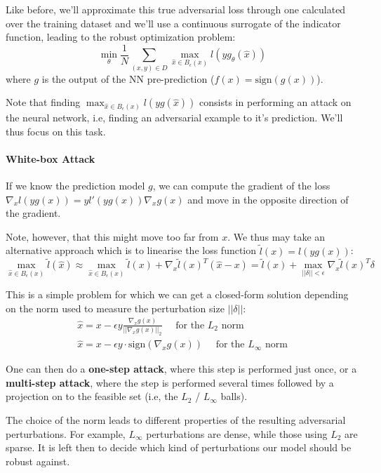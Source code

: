\documentclass{article}
\begin{document}
Like before, we'll approximate this true adversarial loss through one calculated over the training dataset and we'll use a continuous surrogate of the indicator function, leading to the robust optimization problem:
$$
\min_\theta \frac{1}{N} \sum_{(x,y) \in D} \max_{\hat{x} \in B_\epsilon(x)} l(y g_\theta(\hat{x}))
$$
where $g$ is the output of the NN pre-prediction ($f(x) = \text{sign}(g(x))$).

Note that finding $\max_{\hat{x} \in B_\epsilon(x)} l(y g(\hat{x}))$ consists in performing an attack on the neural network, i.e, finding an adversarial example to it's prediction.
We'll thus focus on this task.

\paragraph{White-box Attack}

If we know the prediction model $g$, we can compute the gradient of the loss $\nabla_x l(yg(x)) = yl'(yg(x)) \nabla_x g(x)$ and move in the opposite direction of the gradient.

Note, however, that this might move too far from $x$.
We thus may take an alternative approach which is to linearise the loss function $\tilde{l}(x) = l(yg(x))$:
$$
\max_{\hat{x} \in B_\epsilon(x)} \tilde{l}(\hat{x}) \approx
\max_{\hat{x} \in B_\epsilon(x)} \tilde{l}(x) + \nabla_x \tilde{l}(x)^T (\hat{x} - x) =
\tilde{l}(x) + \max_{||\delta|| < \epsilon} \nabla_x \tilde{l}(x)^T \delta
$$

This is a simple problem for which we can get a closed-form solution depending on the norm used to measure the perturbation size $||\delta||$:
\begin{gather*}
\hat{x} = x - \epsilon y \frac{\nabla_x g(x)}{|| \nabla_x g(x) ||_2} \quad \text{ for the } L_2 \text{ norm} \\
\hat{x} = x - \epsilon y \cdot \text{sign}( \nabla_x g(x) ) \quad \text{ for the } L_\infty \text{ norm} 
\end{gather*}

One can then do a \textbf{one-step attack}, where this step is performed just once, or a \textbf{multi-step attack}, where the step is performed several times followed by a projection on to the feasible set (i.e, the $L_2$ / $L_\infty$ balls).

The choice of the norm leads to different properties of the resulting adversarial perturbations.
For example, $L_\infty$ perturbations are dense, while those using $L_2$ are sparse.
It is left then to decide which kind of perturbations our model should be robust against.
\end{document}
